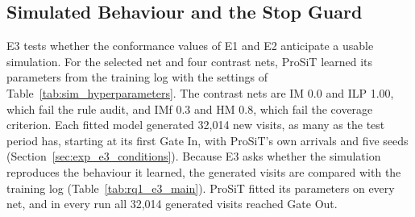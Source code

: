 \subsection{Simulated Behaviour and the Stop Guard}
\label{sec:res_baseline}

E3 tests whether the conformance values of E1 and E2 anticipate a usable
simulation. For the selected net and four contrast nets, ProSiT learned its
parameters from the training log with the settings of
Table~\ref{tab:sim_hyperparameters}. The contrast nets are IM 0.0 and ILP 1.00,
which fail the rule audit, and IMf 0.3 and HM 0.8, which fail the coverage
criterion. Each fitted model generated 32,014 new visits, as many as the test period
has, starting at its first Gate In, with ProSiT's own arrivals and five seeds
(Section~\ref{sec:exp_e3_conditions}). Because E3 asks whether the simulation
reproduces the behaviour it learned, the generated visits are compared with the
training log (Table~\ref{tab:rq1_e3_main}). ProSiT fitted its parameters on every
net, and in every run all 32,014 generated visits reached Gate Out.

